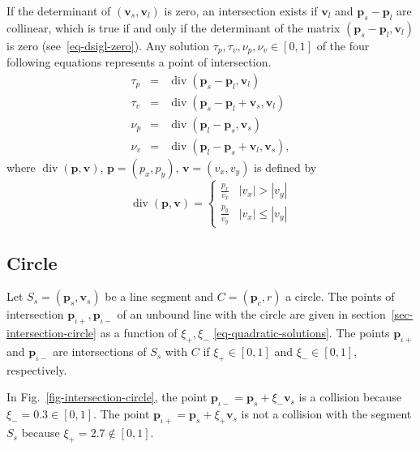 \documentclass[11pt]{article}
\newcommand{\pb}{\mathbf{p}}
\newcommand{\pbc}{\mathbf{p}_c}
\newcommand{\pbl}{\mathbf{p}_l}
\newcommand{\pbs}{\mathbf{p}_s}
\newcommand{\pbiotp}{\mathbf{p}_{\iota+}}
\newcommand{\pbiotm}{\mathbf{p}_{\iota-}}
\newcommand{\vb}{\mathbf{v}}
\newcommand{\vbl}{\mathbf{v}_l}
\newcommand{\vbs}{\mathbf{v}_s}
\DeclareMathOperator{\vecdiv}{div}
\newcommand{\figref}[1]{Fig.~\eqref{#1}}
\begin{document}
If the determinant of $(\vbs,\vbl)$ is zero, an intersection exists if $\vbl$
and $\pbs-\pbl$ are collinear, which is true if and only if the
determinant of the matrix $(\pbs-\pbl,\vbl)$ is zero
(see~\eqref{eq-dsigl-zero}). Any solution $\tau_p,\tau_v,\nu_p,\nu_v\in[0,1]$
of the four following equations represents a point of intersection.
\begin{eqnarray*}
    \tau_p &=& \vecdiv(\pbs - \pbl, \vbl)\\
    \tau_v &=& \vecdiv(\pbs - \pbl + \vbs, \vbl)\\
    \nu_p &=& \vecdiv(\pbl - \pbs, \vbs)\\
    \nu_v &=& \vecdiv(\pbl - \pbs + \vbl, \vbs),
\end{eqnarray*}
where $\vecdiv(\pb,\vb),\,\pb=(p_x,p_y),\,\vb=(v_x, v_y)$ is defined by
\begin{equation*}
    \vecdiv(\pb, \vb) = \begin{cases}
        \frac{p_x}{v_x} & |v_x| > |v_y| \\
        \frac{p_y}{v_y} & |v_x| \leq |v_y|
    \end{cases}
\end{equation*}

\subsection{Circle}
\label{sec-collision-circle}

Let $S_s=(\pbs,\vbs)$ be a line segment and $C=(\pbc,r)$ a circle. The points
of intersection $\pbiotp,\pbiotm$ of an unbound line with the circle are
given in section~\ref{sec-intersection-circle} as a function of $\xi_+,\xi_-$
\eqref{eq-quadratic-solutions}. The points $\pbiotp$ and $\pbiotm$ are
intersections of $S_s$ with $C$ if $\xi_+\in[0,1]$ and $\xi_-\in[0,1]$,
respectively.

In \figref{fig-intersection-circle}, the point $\pbiotm=\pbs+\xi_-\vbs$ is a
collision because $\xi_-=0.3\in[0,1]$. The point $\pbiotp=\pbs+\xi_+\vbs$ is not
a collision with the segment $S_s$ because $\xi_+=2.7\notin[0,1]$.
\end{document}
